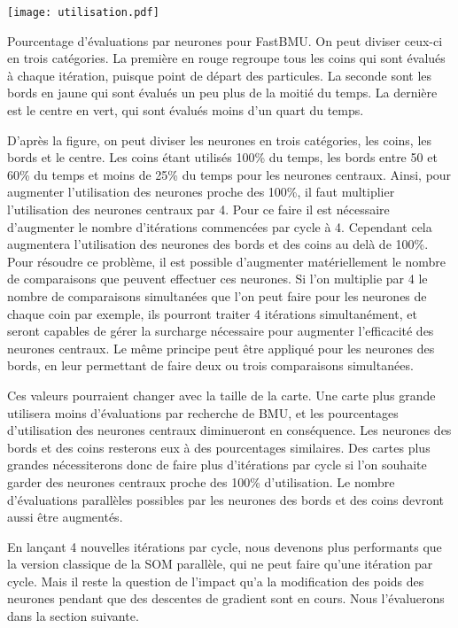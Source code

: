 	\begin{figureth}
    	\centering
    	\texttt{[image: utilisation.pdf]}
    	\caption[Pourcentage d'évaluations par neurones pour FastBMU]{Pourcentage d'évaluations par neurones pour FastBMU. On peut diviser ceux-ci en trois catégories. La première en rouge regroupe tous les coins qui sont évalués à chaque itération, puisque point de départ des particules. La seconde sont les bords en jaune qui sont évalués un peu plus de la moitié du temps. La dernière est le centre en vert, qui sont évalués moins d'un quart du temps.}
    	\label{fig:fast:eval_percent}
	\end{figureth}

	D'après la figure, on peut diviser les neurones en trois catégories, les coins, les bords et le centre. Les coins étant utilisés 100\% du temps, les bords entre 50 et 60\% du temps et moins de 25\% du temps pour les neurones centraux. Ainsi, pour augmenter l'utilisation des neurones proche des 100\%, il faut multiplier l'utilisation des neurones centraux par 4. Pour ce faire il est nécessaire d'augmenter le nombre d'itérations commencées par cycle à 4. Cependant cela augmentera l'utilisation des neurones des bords et des coins au delà de 100\%. Pour résoudre ce problème, il est possible d'augmenter matériellement le nombre de comparaisons que peuvent effectuer ces neurones. Si l'on multiplie par 4 le nombre de comparaisons simultanées que l'on peut faire pour les neurones de chaque coin par exemple, ils pourront traiter 4 itérations simultanément, et seront capables de gérer la surcharge nécessaire pour augmenter l'efficacité des neurones centraux. Le même principe peut être appliqué pour les neurones des bords, en leur permettant de faire deux ou trois comparaisons simultanées.

	Ces valeurs pourraient changer avec la taille de la carte. Une carte plus grande utilisera moins d'évaluations par recherche de BMU, et les pourcentages d'utilisation des neurones centraux diminueront en conséquence. Les neurones des bords et des coins resterons eux à des pourcentages similaires. Des cartes plus grandes nécessiterons donc de faire plus d'itérations par cycle si l'on souhaite garder des neurones centraux proche des 100\% d'utilisation. Le nombre d'évaluations parallèles possibles par les neurones des bords et des coins devront aussi être augmentés.

	En lançant 4 nouvelles itérations par cycle, nous devenons plus performants que la version classique de la SOM parallèle, qui ne peut faire qu'une itération par cycle. Mais il reste la question de l'impact qu'a la modification des poids des neurones pendant que des descentes de gradient sont en cours. Nous l'évaluerons dans la section suivante.

